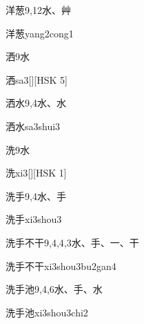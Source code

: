 \begin{entry}{洋葱}{9,12}{⽔、⾋}
  \begin{phonetics}{洋葱}{yang2cong1}
  \end{phonetics}
\end{entry}

\begin{entry}{洒}{9}{⽔}
  \begin{phonetics}{洒}{sa3}[][HSK 5]
  \end{phonetics}
\end{entry}

\begin{entry}{洒水}{9,4}{⽔、⽔}
  \begin{phonetics}{洒水}{sa3shui3}
  \end{phonetics}
\end{entry}

\begin{entry}{洗}{9}{⽔}
  \begin{phonetics}{洗}{xi3}[][HSK 1]
  \end{phonetics}
\end{entry}

\begin{entry}{洗手}{9,4}{⽔、⼿}
  \begin{phonetics}{洗手}{xi3shou3}
  \end{phonetics}
\end{entry}

\begin{entry}{洗手不干}{9,4,4,3}{⽔、⼿、⼀、⼲}
  \begin{phonetics}{洗手不干}{xi3shou3bu2gan4}
  \end{phonetics}
\end{entry}

\begin{entry}{洗手池}{9,4,6}{⽔、⼿、⽔}
  \begin{phonetics}{洗手池}{xi3shou3chi2}
  \end{phonetics}
\end{entry}

